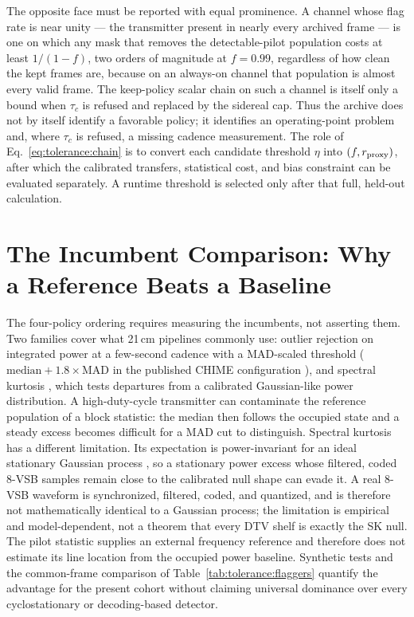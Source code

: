 The opposite face must be reported with equal prominence.  A channel whose flag rate is near unity --- the transmitter present in nearly every archived frame --- is one on which any mask that removes the detectable-pilot population costs at least $1/(1-f)$, two orders of magnitude at $f = 0.99$, regardless of how clean the kept frames are, because on an always-on channel that population is almost every valid frame.  The keep-policy scalar chain on such a channel is itself only a bound when $\tau_c$ is refused and replaced by the sidereal cap.  Thus the archive does not by itself identify a favorable policy; it identifies an operating-point problem and, where $\tau_c$ is refused, a missing cadence measurement.  The role of Eq.~\eqref{eq:tolerance:chain} is to convert each candidate threshold $\eta$ into $(f,r_{\rm proxy})$, after which the calibrated transfers, statistical cost, and bias constraint can be evaluated separately.  A runtime threshold is selected only after that full, held-out calculation.

\section{The Incumbent Comparison: Why a Reference Beats a Baseline}
\label{sec:tolerance:incumbent}

The four-policy ordering requires measuring the incumbents, not asserting them. Two families cover what 21\,cm pipelines commonly use: outlier rejection on integrated power at a few-second cadence with a MAD-scaled threshold ($\text{median}+1.8\times\text{MAD}$ in the published CHIME configuration \cite{amiri2023detection}), and spectral kurtosis \cite{nita2010sk}, which tests departures from a calibrated Gaussian-like power distribution.  A high-duty-cycle transmitter can contaminate the reference population of a block statistic: the median then follows the occupied state and a steady excess becomes difficult for a MAD cut to distinguish.  Spectral kurtosis has a different limitation.  Its expectation is power-invariant for an ideal stationary Gaussian process \cite{nita2010sk}, so a stationary power excess whose filtered, coded 8-VSB samples remain close to the calibrated null shape can evade it.  A real 8-VSB waveform is synchronized, filtered, coded, and quantized, and is therefore not mathematically identical to a Gaussian process; the limitation is empirical and model-dependent, not a theorem that every DTV shelf is exactly the SK null.  The pilot statistic supplies an external frequency reference and therefore does not estimate its line location from the occupied power baseline.  Synthetic tests and the common-frame comparison of Table~\ref{tab:tolerance:flaggers} quantify the advantage for the present cohort without claiming universal dominance over every cyclostationary or decoding-based detector.

